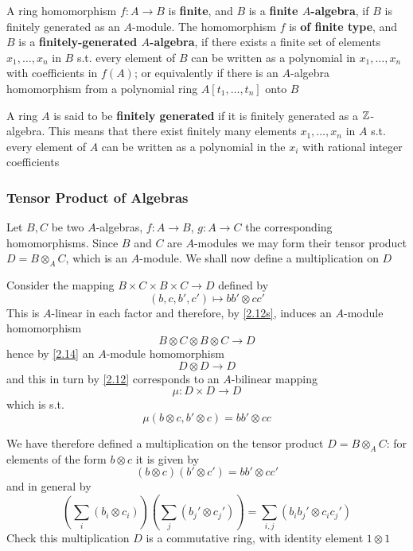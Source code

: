 \documentclass[11pt]{article}
\begin{document}
A ring homomorphism \(f:A\to B\) is \textbf{finite}, and \(B\) is a \textbf{finite \(A\)-algebra}, if \(B\) is
finitely generated as an \(A\)-module. The homomorphism \(f\) is \textbf{of finite type}, and \(B\) is a
\textbf{finitely-generated \(A\)-algebra}, if there exists a finite set of elements \(x_1,\dots,x_n\) in \(B\)
s.t. every element of \(B\) can be written as a polynomial in \(x_1,\dots,x_n\) with coefficients
in \(f(A)\); or equivalently if there is an \(A\)-algebra homomorphism from a polynomial
ring \(A[t_1,\dots,t_n]\) onto \(B\)

A ring \(A\) is said to be \textbf{finitely generated} if it is finitely generated as a \(\mathbb{Z}\)-algebra.
This means that there exist finitely many elements \(x_1,\dots,x_n\) in \(A\) s.t. every element
of \(A\) can be written as a polynomial in the \(x_i\) with rational integer coefficients
\subsubsection*{Tensor Product of Algebras}
\label{sec:org940597a}
Let \(B,C\) be two \(A\)-algebras, \(f:A\to B\), \(g:A\to C\) the corresponding homomorphisms.
Since \(B\) and \(C\) are \(A\)-modules we may form their tensor product \(D=B\otimes_AC\), which is
an \(A\)-module. We shall now define a multiplication on \(D\)

Consider the mapping \(B\times C\times B\times C\to D\) defined by
\begin{equation*}
(b,c,b',c')\mapsto bb'\otimes cc'
\end{equation*}
This is \(A\)-linear in each factor and therefore, by \ref{2.12s}, induces an \(A\)-module
homomorphism
\begin{equation*}
B\otimes C\otimes B\otimes C\to D
\end{equation*}
hence by \ref{2.14} an \(A\)-module homomorphism
\begin{equation*}
D\otimes D\to D
\end{equation*}
and this in turn by \ref{2.12} corresponds to an \(A\)-bilinear mapping
\begin{equation*}
\mu:D\times D\to D
\end{equation*}
which is s.t.
\begin{equation*}
\mu(b\otimes c,b'\otimes c)=bb'\otimes cc
\end{equation*}

We have therefore defined a multiplication on the tensor product \(D=B\otimes_AC\): for elements of
the form \(b\otimes c\) it is given by
\begin{equation*}
(b\otimes c)(b'\otimes c')=bb'\otimes cc'
\end{equation*}
and in general by
\begin{equation*}
\left( \sum_i(b_i\otimes c_i) \right)\left( \sum_j(b_j'\otimes c_j') \right)=\sum_{i,j}(b_ib_j'\otimes c_ic_j')
\end{equation*}
Check this multiplication \(D\) is a commutative ring, with identity element \(1\otimes 1\)
\end{document}
